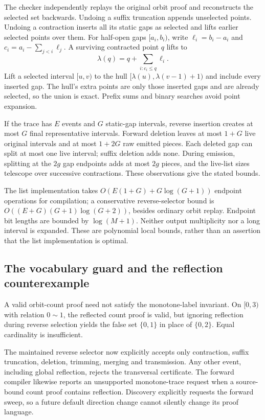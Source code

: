 The checker independently replays the original orbit proof and reconstructs
the selected set backwards. Undoing a suffix truncation appends unselected
points. Undoing a contraction inserts all its static gaps as selected and
lifts earlier selected points over them. For half-open gaps $[a_i,b_i)$,
write $\ell_i=b_i-a_i$ and $c_i=a_i-\sum_{j<i}\ell_j$. A surviving contracted
point $q$ lifts to
\[
 \lambda(q)=q+\sum_{i:c_i\le q}\ell_i.
\]
Lift a selected interval $[u,v)$ to the hull
$[\lambda(u),\lambda(v-1)+1)$ and include every inserted gap. The hull's
extra points are only those inserted gaps and are already selected, so
the union is exact. Prefix sums and binary searches avoid point expansion.

If the trace has $E$ events and $G$ static-gap intervals, reverse insertion
creates at most $G$ final representative intervals. Forward deletion leaves
at most $1+G$ live original intervals and at most $1+2G$ raw emitted pieces.
Each deleted gap can split at most one live interval; suffix deletion adds
none. During emission, splitting at the $2g$ gap endpoints adds at most
$2g$ pieces, and the live-list sizes telescope over successive contractions.
These observations give the stated bounds.

The list implementation takes
$O(E(1+G)+G\log(G+1))$ endpoint operations for compilation; a conservative
reverse-selector bound is $O((E+G)(G+1)\log(G+2))$, besides ordinary orbit
replay. Endpoint bit lengths are bounded by $\log(M+1)$. Neither output
multiplicity nor a long interval is expanded. These are polynomial local
bounds, rather than an assertion that the list implementation is optimal.

\subsection{The vocabulary guard and the reflection counterexample}

A valid orbit-count proof need not satisfy the monotone-label invariant.
On $[0,3)$ with relation $0\sim1$, the reflected count proof is valid, but
ignoring reflection during reverse selection yields the false set
$\{0,1\}$ in place of $\{0,2\}$. Equal cardinality is insufficient.

The maintained reverse selector now explicitly accepts only contraction,
suffix truncation, deletion, trimming, merging and transmission. Any other
event, including global reflection, rejects the transversal certificate.
The forward compiler likewise reports an unsupported monotone-trace request
when a source-bound count proof contains reflection. Discovery explicitly
requests the forward sweep, so a future default direction change cannot
silently change its proof language.

